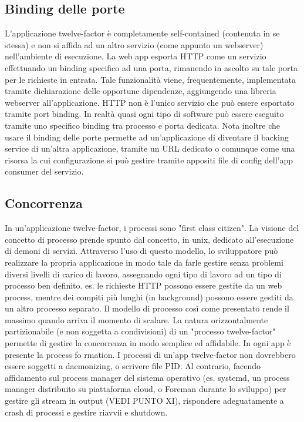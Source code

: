 \documentclass[PianoDiQualifica.tex]{subfiles}
\begin{document}
\subsection{Binding delle porte}
L'applicazione twelve-factor è completamente self-contained (contenuta in se stessa) e non si affida ad un altro servizio (come appunto un webserver) nell'ambiente di esecuzione. La web app esporta HTTP come un servizio effettuando un binding specifico ad una porta, rimanendo in ascolto su tale porta per le richieste in entrata. Tale funzionalità viene, frequentemente, implementata tramite dichiarazione delle opportune dipendenze, aggiungendo una libreria webserver all'applicazione.
HTTP non è l'unico servizio che può essere esportato tramite port binding. In realtà quasi ogni tipo di software può essere eseguito tramite uno specifico binding tra processo e porta dedicata.
Nota inoltre che usare il binding delle porte permette ad un'applicazione di diventare il backing service di un'altra applicazione, tramite un URL dedicato o comunque come una risorsa la cui configurazione si può gestire tramite appositi file di config dell'app consumer del servizio.

\subsection{Concorrenza}
In un'applicazione twelve-factor, i processi sono "first class citizen". La visione del concetto di processo prende spunto dal concetto, in unix, dedicato all'esecuzione di demoni di servizi. Attraverso l'uso di questo modello, lo sviluppatore può realizzare la propria applicazione in modo tale da farle gestire senza problemi diversi livelli di carico di lavoro, assegnando ogni tipo di lavoro ad un tipo di processo ben definito.
es. le richieste HTTP possono essere gestite da un web process, mentre dei compiti più lunghi (in background) possono essere gestiti da un altro processo separato.
Il modello di processo così come presentato rende il massimo quando arriva il momento di scalare. La natura orizzontalmente partizionabile (e non soggetta a condivisioni) di un "processo twelve-factor" permette di gestire la concorrenza in modo semplice ed affidabile. 
In ogni app è presente la process fo	rmation.
I processi di un'app twelve-factor non dovrebbero essere soggetti a daemonizing, o scrivere file PID. Al contrario, facendo affidamento sul process manager del sistema operativo (es. systemd, un process manager distribuito su piattaforma cloud, o Foreman durante lo sviluppo) per gestire gli stream in output (VEDI PUNTO XI), rispondere adeguatamente a crash di processi e gestire riavvii e shutdown.
\end{document}
